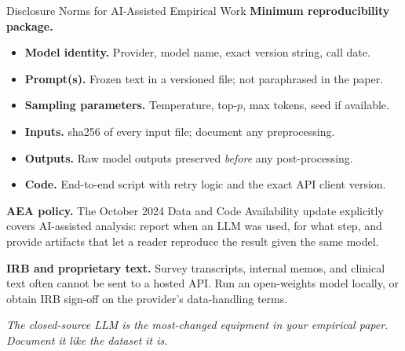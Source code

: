 \begin{frame}{Disclosure Norms for AI-Assisted Empirical Work}
\footnotesize
\textbf{Minimum reproducibility package.}
\begin{itemize}\itemsep1pt
  \item \textbf{Model identity.} Provider, model name, exact version string, call date.
  \item \textbf{Prompt(s).} Frozen text in a versioned file; not paraphrased in the paper.
  \item \textbf{Sampling parameters.} Temperature, top-$p$, max tokens, seed if available.
  \item \textbf{Inputs.} sha256 of every input file; document any preprocessing.
  \item \textbf{Outputs.} Raw model outputs preserved \emph{before} any post-processing.
  \item \textbf{Code.} End-to-end script with retry logic and the exact API client version.
\end{itemize}

\smallskip
\textbf{AEA policy.} The October 2024 Data and Code Availability update explicitly covers AI-assisted analysis: report when an LLM was used, for what step, and provide artifacts that let a reader reproduce the result given the same model.

\smallskip
\textbf{IRB and proprietary text.} Survey transcripts, internal memos, and clinical text often cannot be sent to a hosted API. Run an open-weights model locally, or obtain IRB sign-off on the provider's data-handling terms.

\smallskip
\textit{The closed-source LLM is the most-changed equipment in your empirical paper. Document it like the dataset it is.}
\end{frame}

